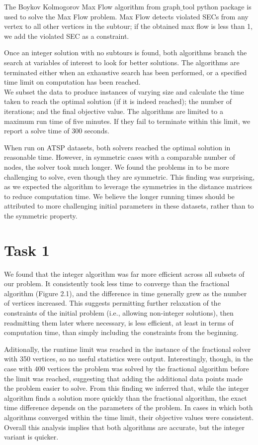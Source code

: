 \documentclass[12pt]{article}
\numberwithin{equation}{section}
\begin{document}
The Boykov Kolmogorov Max Flow algorithm from graph$\_$tool python package is used to solve the Max Flow problem. Max Flow detects violated SECs from any vertex to all other vertices in the subtour; if the obtained max flow is less than 1, we add the violated SEC as a constraint.

Once an integer solution with no subtours is found, both algorithms branch the search at variables of interest to look for better solutions. The algorithms are terminated either when an exhaustive search has been performed, or a specified time limit on computation has been reached.\\

We subset the data to produce instances of varying size and calculate the time taken to reach the optimal solution (if it is indeed reached); the number of iterations; and the final objective value. The algorithms are limited to a maximum run time of five minutes. If they fail to terminate within this limit, we report a solve time of 300 seconds.

When run on ATSP datasets, both solvers reached the optimal solution in reasonable time. However, in symmetric cases with a comparable number of nodes, the solver took much longer. We found the problems in \cite{web:tsp} to be more challenging to solve, even though they are symmetric. This finding was surprising, as we expected the algorithm to leverage the symmetries in the distance matrices to reduce computation time. We believe the longer running times should be attributed to more challenging initial parameters in these datasets, rather than to the symmetric property. 

\section{Task 1}

 We found that the integer algorithm was far more efficient across all subsets of our problem. It consistently took less time to converge than the fractional algorithm (Figure 2.1), and the difference in time generally grew as the number of vertices increased. This suggests permitting further relaxation of the constraints of the initial problem (i.e., allowing non-integer solutions), then readmitting them later where necessary, is less efficient, at least in terms of computation time, than simply including the constraints from the beginning. 
 
 Aditionally, the runtime limit was reached in the instance of the fractional solver with 350 vertices, so no useful statistics were output. Interestingly, though, in the case with 400 vertices the problem was solved by the fractional algorithm before the limit was reached, suggesting that adding the additional data points made the problem easier to solve. From this finding we inferred that, while the integer algorithm finds a solution more quickly than the fractional algorithm, the exact time difference depends on the parameters of the problem. In cases in which both algorithms converged within the time limit, their objective values were consistent. Overall this analysis implies that both algorithms are accurate, but the integer variant is quicker. 
 
\end{document}
